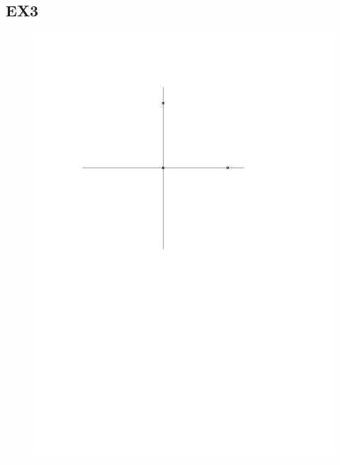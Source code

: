 \documentclass[11pt]{article}
\begin{document}
\subsection*{EX3}
	\begin{figure}[H]
		\centering
		\includegraphics[width=0.6\linewidth]{6x6-cercles/sources/mol2.pdf}
	\end{figure}
\end{document}

